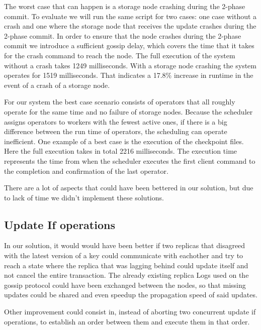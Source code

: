 \documentclass[times, 10pt,twocolumn]{article}
\begin{document}
The worst case that can happen is a storage node crashing during the 2-phase commit.
To evaluate we will run the same script for two cases: one case without a crash and one where the storage node that receives the update crashes during the 2-phase commit.
In order to ensure that the node crashes during the 2-phase commit we introduce a sufficient gossip delay, which covers the time that it takes for the crash command to reach the node.
The full execution of the system without a crash takes 1249 milliseconds.
With a storage node crashing the system operates for 1519 milliseconds.
That indicates a 17.8\% increase in runtime in the event of a crash of a storage node.

For our system the best case scenario consists of operators that all roughly operate for the same time and no failure of storage nodes.
Because the scheduler assigns operators to workers with the fewest active ones, if there is a big difference between the run time of operators, the scheduling can operate inefficient.
One example of a best case is the execution of the checkpoint files.
Here the full execution takes in total 2216 milliseconds.
The execution time represents the time from when the scheduler executes the first client command to the completion and confirmation of the last operator.



There are a lot of aspects that could have been bettered in our solution, but due to lack of time we didn't implement these solutions.

\subsection{Update If operations}

In our solution, it would would have been better if two replicas that disagreed with the latest version of a key could communicate with eachother and try to reach
a state where the replica that was lagging behind could update itself and not cancel the entire transaction. The already existing replica Logs used on the gossip protocol could have been
exchanged between the nodes, so that missing updates could be shared and even speedup the propagation speed of said updates.

Other improvement could consist in, instead of aborting two concurrent update if operations, to establish an order between them and execute them in that order.
\end{document}
